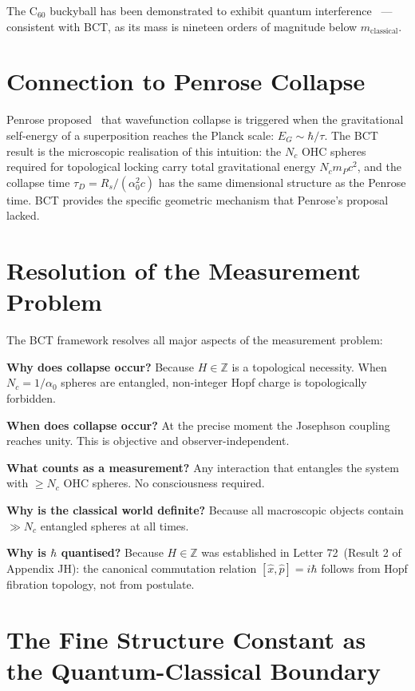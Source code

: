 \documentclass[aps,prl,twocolumn,superscriptaddress,showpacs]{revtex4-2}
\begin{document}
The C$_{60}$ buckyball has been demonstrated to exhibit quantum 
interference~\cite{Arndt1999} --- consistent with BCT, as its mass 
is nineteen orders of magnitude below $m_\mathrm{classical}$.

\section{Connection to Penrose Collapse}

Penrose proposed~\cite{Penrose1996} that wavefunction collapse is 
triggered when the gravitational self-energy of a superposition reaches 
the Planck scale: $E_G \sim \hbar/\tau$. The BCT result is the 
microscopic realisation of this intuition: the $N_c$ OHC spheres 
required for topological locking carry total gravitational energy 
$N_c m_P c^2$, and the collapse time $\tau_D = R_s/(\alpha_0^2 c)$ 
has the same dimensional structure as the Penrose time. BCT provides 
the specific geometric mechanism that Penrose's proposal lacked.

\section{Resolution of the Measurement Problem}

The BCT framework resolves all major aspects of the measurement problem:

\textbf{Why does collapse occur?} Because $H \in \mathbb{Z}$ is a 
topological necessity. When $N_c = 1/\alpha_0$ spheres are entangled, 
non-integer Hopf charge is topologically forbidden.

\textbf{When does collapse occur?} At the precise moment the Josephson 
coupling reaches unity. This is objective and observer-independent.

\textbf{What counts as a measurement?} Any interaction that entangles 
the system with $\geq N_c$ OHC spheres. No consciousness required.

\textbf{Why is the classical world definite?} Because all macroscopic 
objects contain $\gg N_c$ entangled spheres at all times.

\textbf{Why is $\hbar$ quantised?} Because $H \in \mathbb{Z}$ was 
established in Letter 72~(Result 2 of Appendix JH): the canonical 
commutation relation $[\hat{x},\hat{p}] = i\hbar$ follows from 
Hopf fibration topology, not from postulate.

\section{The Fine Structure Constant as the Quantum-Classical Boundary}
\end{document}

